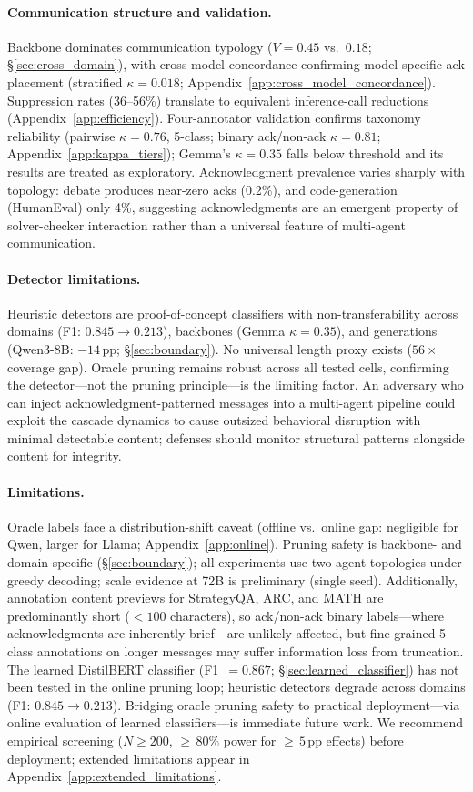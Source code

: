 \paragraph{Communication structure and validation.}
Backbone dominates communication typology ($V = 0.45$ vs.\ $0.18$; \S\ref{sec:cross_domain}), with cross-model concordance confirming model-specific ack placement (stratified $\kappa = 0.018$; Appendix~\ref{app:cross_model_concordance}). Suppression rates (36--56\%) translate to equivalent inference-call reductions (Appendix~\ref{app:efficiency}). Four-annotator validation confirms taxonomy reliability (pairwise $\kappa = 0.76$, 5-class; binary ack/non-ack $\kappa = 0.81$; Appendix~\ref{app:kappa_tiers}); Gemma's $\kappa = 0.35$ falls below threshold and its results are treated as exploratory. Acknowledgment prevalence varies sharply with topology: debate produces near-zero acks (0.2\%), and code-generation (HumanEval) only 4\%, suggesting acknowledgments are an emergent property of solver-checker interaction rather than a universal feature of multi-agent communication.

\paragraph{Detector limitations.}
Heuristic detectors are proof-of-concept classifiers with non-transferability across domains (F1: $0.845 \to 0.213$), backbones (Gemma $\kappa = 0.35$), and generations (Qwen3-8B: $-14$\,pp; \S\ref{sec:boundary}). No universal length proxy exists ($56\times$ coverage gap). Oracle pruning remains robust across all tested cells, confirming the detector---not the pruning principle---is the limiting factor. An adversary who can inject acknowledgment-patterned messages into a multi-agent pipeline could exploit the cascade dynamics to cause outsized behavioral disruption with minimal detectable content; defenses should monitor structural patterns alongside content for integrity.

\paragraph{Limitations.}
Oracle labels face a distribution-shift caveat (offline vs.\ online gap: negligible for Qwen, larger for Llama; Appendix~\ref{app:online}). Pruning safety is backbone- and domain-specific (\S\ref{sec:boundary}); all experiments use two-agent topologies under greedy decoding; scale evidence at 72B is preliminary (single seed). Additionally, annotation content previews for StrategyQA, ARC, and MATH are predominantly short ($< 100$ characters), so ack/non-ack binary labels---where acknowledgments are inherently brief---are unlikely affected, but fine-grained 5-class annotations on longer messages may suffer information loss from truncation. The learned DistilBERT classifier (F1~$= 0.867$; \S\ref{sec:learned_classifier}) has not been tested in the online pruning loop; heuristic detectors degrade across domains (F1: $0.845 \to 0.213$). Bridging oracle pruning safety to practical deployment---via online evaluation of learned classifiers---is immediate future work. We recommend empirical screening ($N \geq 200$, ${\geq}\,80\%$ power for ${\geq}\,5$\,pp effects) before deployment; extended limitations appear in Appendix~\ref{app:extended_limitations}.
